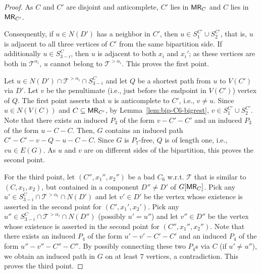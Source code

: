 \documentclass[11pt,a4paper]{article}
\theoremstyle{definition}
\def\T{\mathcal{T}}
\begin{document}
\begin{proof}
    As $C$ and $C'$ are disjoint and anticomplete, $C'$ lies in $\mathsf{MR}_C$ and $C$ lies in $\mathsf{MR}_{C'}$. 

    Consequently, if $u \in N(D')$ has a neighbor in $C'$, then $u \in S_1^{C'} \cup S_2^{C'}$, 
    that is, $u$ is adjacent to all three vertices of $C'$ from the same bipartition side.
    If additionally $u \in S^C_{3-i}$, then $u$ is adjacent to both $x_i$ and $x_i'$;
    as these vertices are both in $\T^{\alpha_i}$, $u$ cannot belong to $\T^{> \alpha_i}$. 
    This proves the first point. 

    Let $u \in N(D') \cap \T^{> \alpha_i} \cap S^C_{3-i}$ and let $Q$
    be a shortest path from $u$ to $V(C')$ via $D'$. 
    Let $v$ be the penultimate (i.e., just before the endpoint in $V(C')$) vertex
    of $Q$. The first point asserts that $u$ is anticomplete to $C'$, i.e., $v \neq u$.
    Since $u \in N(V(C))$ and $C \subseteq \mathsf{MR}_{C'}$,
    by Lemma~\ref{lem:bip-C6-bigrest}, $v \in S_1^{C'} \cup S_2^{C'}$. 
    Note that there exists an induced $P_3$ of the form $v - C' - C'$ and an induced $P_3$ of the form
    $u-C-C$. Then, $G$ contains an induced path $C'-C'-v-Q-u-C-C$. Since $G$ is $P_7$-free,
    $Q$ is of length one, i.e., $v u \in E(G)$.
    As $u$ and $v$ are on different sides of the bipartition, this proves the second point.

    For the third point, let $(C'',x_1'',x_2'')$ be a bad $C_6$ w.r.t. $\T$
    that is similar to $(C,x_1,x_2)$,
    but contained in a component $D'' \neq D'$ of $G[\mathsf{MR}_C]$.
    Pick any $u' \in S^C_{3-i} \cap \T^{> \alpha_i} \cap N(D')$
    and let $v' \in D'$ be the vertex whose existence is asserted in the second point
    for $(C',x_1',x_2')$.
    Pick any $u'' \in S^C_{3-i} \cap \T^{> \alpha_i} \cap N(D'')$ (possibly $u' = u''$)
    and let $v'' \in D''$ be the vertex whose existence is asserted in the second point
    for $(C'',x_1'',x_2'')$.
    Note that there exists an induced $P_4$ of the form $u'-v'-C'-C'$ and an induced $P_4$
    of the form $u''-v''-C''-C''$. By possibly connecting these two $P_4$s via $C$
    (if $u' \neq u''$), we obtain an induced path in $G$ on at least $7$ vertices, a contradiction.
    This proves the third point.
\end{proof}
\end{document}
